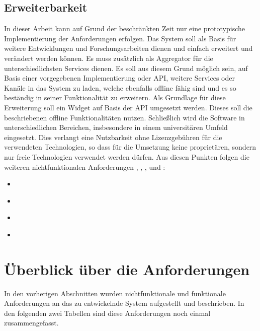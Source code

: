 \subsection{Erweiterbarkeit}
In dieser Arbeit kann auf Grund der beschränkten Zeit nur eine prototypische Implementierung der Anforderungen erfolgen. Das System soll als Basis für weitere Entwicklungen und Forschungsarbeiten dienen und einfach erweitert und verändert werden können. Es muss zusätzlich als Aggregator für die unterschiedlichsten Services dienen. Es soll aus diesem Grund möglich sein, auf Basis einer vorgegebenen Implementierung oder \ac{API}, weitere Services oder Kanäle in das System zu laden, welche ebenfalls offline fähig sind und es so beständig in seiner Funktionalität zu erweitern. Als Grundlage für diese Erweiterung soll ein Widget auf Basis der \ac{API} umgesetzt werden. Dieses soll die beschriebenen offline Funktionalitäten nutzen. Schließlich wird die Software in unterschiedlichen Bereichen, insbesondere in einem universitären Umfeld eingesetzt. Dies verlangt eine Nutzbarkeit ohne Lizenzgebühren für die verwendeten Technologien, so dass für die Umsetzung keine proprietären, sondern nur freie Technologien verwendet werden dürfen. Aus diesen Punkten folgen die weiteren nichtfunktionalen Anforderungen , , , und :
\begin{itemize}
 \item \requirementnf{\requirementNewWidgetsWithApi}\label{requirementNewWidgetsWithApi}
 \item \requirementnf{\requirementExampleWidget}\label{requirementExampleWidget}
 \item \requirementnf{\requirementExtensibility}\label{requirementExtensibility}
 \item \requirementnf{\requirementOpenSource}\label{requirementOpenSource}
\end{itemize}

\section{Überblick über die Anforderungen}
In den vorherigen Abschnitten wurden nichtfunktionale und funktionale Anforderungen an das zu entwickelnde System aufgestellt und beschrieben. In den folgenden zwei Tabellen sind diese Anforderungen noch einmal zusammengefasst.

